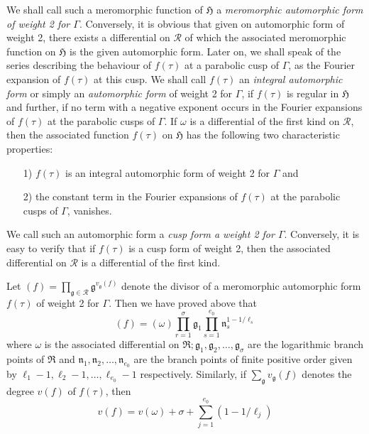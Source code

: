 We shall call such a meromorphic function of $\mathfrak{H}$ a
\textit{meromorphic automorphic form of weight 2 for
  $\Gamma$}. Conversely, it is obvious that given on automorphic form
of weight 2, there exists a differential on $\mathscr{R}$ of which the
associated meromorphic function on $\mathfrak{H}$ is the given
automorphic form. Later on, we shall speak of the series describing
the behaviour of $f(\tau)$ at a parabolic cusp of $\Gamma$, as the
Fourier expansion of $f(\tau)$ at this cusp. We shall \pageoriginale
call $f(\tau)$ an \textit{integral automorphic form} or simply an
\textit{automorphic form} of weight 2 for $\Gamma$, if $f(\tau)$ is
regular in $\mathfrak{H}$ and further, if no term with a negative
exponent occurs in the Fourier expansions of $f(\tau)$ at the
parabolic cusps of $\Gamma$. If $\omega$ is a differential of the
first kind on $\mathscr{R}$, then the associated function $f(\tau)$ on
$\mathfrak{H}$ has the following two characteristic properties:
\begin{itemize}
\item[1)] $f(\tau)$ is an integral automorphic form of weight 2 for
  $\Gamma$ and 

\item[2)] the constant term in the Fourier expansions of $f(\tau)$ at
  the parabolic cusps of $\Gamma$, vanishes.
\end{itemize}

We call such an automorphic form a \textit{cusp form a weight 2 for
  $\Gamma$}. Conversely, it is easy to verify that if $f(\tau)$ is a
cusp form of weight 2, then the associated differential on
$\mathscr{R}$ is a differential of the first kind.

Let
$(f)=\prod\limits_{\mathfrak{g}\in\mathscr{R}}\mathfrak{g}^{v_{\mathfrak{g}}(f)}$ 
denote the divisor of a meromorphic automorphic form $f(\tau)$ of
weight 2 for $\Gamma$. Then we have proved above that  
\begin{equation*}
(f) = (\omega) \prod^{\sigma}_{r=1} \mathfrak{g}_1 \prod^{e_0}_{s=1}
  \mathfrak{n}^{1-1/\ell_s}_s \tag{4}\label{eq6:4}
\end{equation*}
where $\omega$ is the associated differential on $\mathfrak{R};
\mathfrak{g}_1, \mathfrak{g}_2, \ldots , \mathfrak{g}_{\sigma}$ are
the logarithmic branch points of $\mathfrak{R}$ and $\mathfrak{n}_1,
\mathfrak{n}_2, \ldots, \mathfrak{n}_{e_0}$ are the branch points of
finite positive order given by $\ell_1-1, \ell_2-1, \ldots, \ell_{e_0}
-1$ respectively. Similarly, if $\sum_{\mathfrak{g}}
v_{\mathfrak{g}}(f)$ denotes the degree $v(f)$ of $f(\tau)$, then 
\begin{equation*}
v(f) = v(\omega) + \sigma + \sum^{e_0}_{j=1} (1-1/\ell_j) \tag{5}\label{eq6:5}
\end{equation*}

